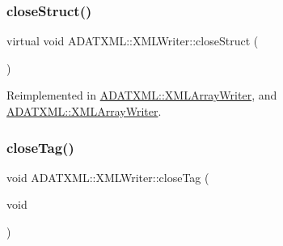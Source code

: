 \subsubsection{\texorpdfstring{closeStruct()}{closeStruct()}\hspace{0.1cm}{\footnotesize\ttfamily [2/2]}}
{\footnotesize\ttfamily virtual void A\+D\+A\+T\+X\+M\+L\+::\+X\+M\+L\+Writer\+::close\+Struct (\begin{DoxyParamCaption}{ }\end{DoxyParamCaption})\hspace{0.3cm}{\ttfamily [virtual]}}



Reimplemented in \mbox{\hyperlink{classADATXML_1_1XMLArrayWriter_a5a849f8851bce99654c44dc08b1fe486}{A\+D\+A\+T\+X\+M\+L\+::\+X\+M\+L\+Array\+Writer}}, and \mbox{\hyperlink{classADATXML_1_1XMLArrayWriter_a5a849f8851bce99654c44dc08b1fe486}{A\+D\+A\+T\+X\+M\+L\+::\+X\+M\+L\+Array\+Writer}}.

\mbox{\label{classADATXML_1_1XMLWriter_a13209ef7863272707bf8fea7c172e9f1}} 
\subsubsection{\texorpdfstring{closeTag()}{closeTag()}\hspace{0.1cm}{\footnotesize\ttfamily [1/2]}}
{\footnotesize\ttfamily void A\+D\+A\+T\+X\+M\+L\+::\+X\+M\+L\+Writer\+::close\+Tag (\begin{DoxyParamCaption}\item[{void}]{ }\end{DoxyParamCaption})}

